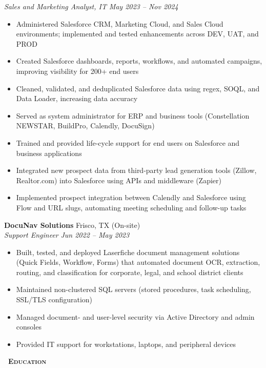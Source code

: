 \documentclass[a4paper,11pt]{article}
\newcommand{\header} [1] {
    {\textsc{\textbf{\Large{\xrfill[0.5ex]{0.5pt}~#1~\xrfill[0.5ex]{0.5pt}}}}}
}
\begin{document}
\vspace{1mm}
\textit{Sales and Marketing Analyst, IT} \hfill  \textit{May 2023 -- Nov 2024}
\begin{itemize}
\item Administered Salesforce CRM, Marketing Cloud, and Sales Cloud environments; implemented and tested enhancements across DEV, UAT, and PROD
\item Created Salesforce dashboards, reports, workflows, and automated campaigns, improving visibility for 200+ end users
\item Cleaned, validated, and deduplicated Salesforce data using regex, SOQL, and Data Loader, increasing data accuracy
\item Served as system administrator for ERP and business tools (Constellation NEWSTAR, BuildPro, Calendly, DocuSign)
\item Trained and provided life-cycle support for end users on Salesforce and business applications
\item Integrated new prospect data from third-party lead generation tools (Zillow, Realtor.com) into Salesforce using APIs and middleware (Zapier)
\item Implemented prospect integration between Calendly and Salesforce using Flow and URL slugs, automating meeting scheduling and follow-up tasks
\end{itemize}

\vspace{1mm}
\textbf{DocuNav Solutions} \hfill Frisco, TX (On-site) \\
\textit{Support Engineer} \hfill  \textit{Jun 2022 -- May 2023}
\begin{itemize}
\item Built, tested, and deployed Laserfiche document management solutions (Quick Fields, Workflow, Forms) that automated document OCR, extraction, routing, and classification for corporate, legal, and school district clients
\item Maintained non-clustered SQL servers (stored procedures, task scheduling, SSL/TLS configuration)
\item Managed document- and user-level security via Active Directory and admin consoles
\item Provided IT support for workstations, laptops, and peripheral devices
\end{itemize}

\pagebreak
\vspace{2mm}
\header{Education}
\end{document}
